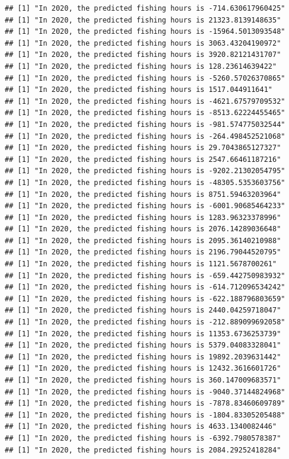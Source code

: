 \documentclass[
]{article}
\begin{document}
\begin{verbatim}
## [1] "In 2020, the predicted fishing hours is -714.630617960425"
## [1] "In 2020, the predicted fishing hours is 21323.8139148635"
## [1] "In 2020, the predicted fishing hours is -15964.5013093548"
## [1] "In 2020, the predicted fishing hours is 3063.43204190972"
## [1] "In 2020, the predicted fishing hours is 3920.82121431707"
## [1] "In 2020, the predicted fishing hours is 128.23614639422"
## [1] "In 2020, the predicted fishing hours is -5260.57026370865"
## [1] "In 2020, the predicted fishing hours is 1517.044911641"
## [1] "In 2020, the predicted fishing hours is -4621.67579709532"
## [1] "In 2020, the predicted fishing hours is -8513.62224455465"
## [1] "In 2020, the predicted fishing hours is -981.574775032544"
## [1] "In 2020, the predicted fishing hours is -264.498452521068"
## [1] "In 2020, the predicted fishing hours is 29.7043865127327"
## [1] "In 2020, the predicted fishing hours is 2547.66461187216"
## [1] "In 2020, the predicted fishing hours is -9202.21302054795"
## [1] "In 2020, the predicted fishing hours is -48305.5353603756"
## [1] "In 2020, the predicted fishing hours is 8751.59463203964"
## [1] "In 2020, the predicted fishing hours is -6001.90685464233"
## [1] "In 2020, the predicted fishing hours is 1283.96323378996"
## [1] "In 2020, the predicted fishing hours is 2076.14289036648"
## [1] "In 2020, the predicted fishing hours is 2095.36140210988"
## [1] "In 2020, the predicted fishing hours is 2196.79044520795"
## [1] "In 2020, the predicted fishing hours is 1121.5678700261"
## [1] "In 2020, the predicted fishing hours is -659.442750983932"
## [1] "In 2020, the predicted fishing hours is -614.712096534242"
## [1] "In 2020, the predicted fishing hours is -622.188796803659"
## [1] "In 2020, the predicted fishing hours is 2440.04259718047"
## [1] "In 2020, the predicted fishing hours is -212.889099692058"
## [1] "In 2020, the predicted fishing hours is 11353.6736253739"
## [1] "In 2020, the predicted fishing hours is 5379.04083328041"
## [1] "In 2020, the predicted fishing hours is 19892.2039631442"
## [1] "In 2020, the predicted fishing hours is 12432.3616601726"
## [1] "In 2020, the predicted fishing hours is 360.147009683571"
## [1] "In 2020, the predicted fishing hours is -9040.37144824968"
## [1] "In 2020, the predicted fishing hours is -7878.83460609789"
## [1] "In 2020, the predicted fishing hours is -1804.83305205488"
## [1] "In 2020, the predicted fishing hours is 4633.1340082446"
## [1] "In 2020, the predicted fishing hours is -6392.7980578387"
## [1] "In 2020, the predicted fishing hours is 2084.29252418284"

\end{verbatim}
\end{document}
